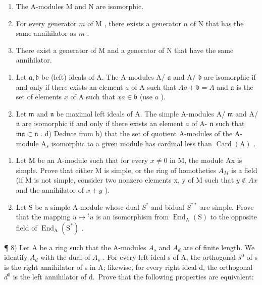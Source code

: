 \begin{enumerate}
\def\labelenumi{(\roman{enumi})}
\item
  The A-modules M and N are isomorphic.
\item
  For every generator \(m\) of \(\mathrm{M}\) , there exists a generator \(n\) of \(\mathrm{N}\) that has the same annihilator as \(m\) .
\item
  There exist a generator of M and a generator of N that have the same annihilator.
\end{enumerate}

\begin{enumerate}
\def\labelenumi{\alph{enumi})}
\setcounter{enumi}{1}
\item
  Let \(\mathfrak{a},\mathfrak{b}\) be (left) ideals of A. The A-modules A/ \(\mathfrak{a}\) and A/ \(\mathfrak{b}\) are isomorphic if and only if there exists an element \(a\) of A such that \(Aa + \mathfrak{b} = A\) and \(\mathfrak{a}\) is the set of elements \(x\) of A such that \(xa\in \mathfrak{b}\) (use \(a\) ).
\item
  Let \(\mathfrak{m}\) and \(\mathfrak{n}\) be maximal left ideals of A. The simple A-modules A/ \(\mathfrak{m}\) and A/ \(\mathfrak{n}\) are isomorphic if and only if there exists an element \(a\) of A- \(\mathfrak{n}\) such that \(\mathfrak{ma} \subset \mathfrak{n}\) . d) Deduce from b) that the set of quotient A-modules of the A-module \(\mathrm{A}_s\) isomorphic to a given module has cardinal less than \(\operatorname{Card}(\mathrm{A})\) .
\end{enumerate}

\begin{enumerate}
\def\labelenumi{\arabic{enumi})}
\setcounter{enumi}{5}
\item
  Let M be an A-module such that for every \(x \neq 0\) in M, the module Ax is simple. Prove that either M is simple, or the ring of homotheties \(A_{M}\) is a field (if M is not simple, consider two nonzero elements x, y of M such that \(y \notin Ax\) and the annihilator of \(x + y\) ).
\item
  Let S be a simple A-module whose dual \(S^{*}\) and bidual \(S^{**}\) are simple. Prove that the mapping \(u \mapsto {}^{t}u\) is an isomorphism from \(\operatorname{End}_{\mathrm{A}}(\mathrm{S})\) to the opposite field of \(\operatorname{End}_{\mathrm{A}}(\mathrm{S}^{*})\) .
\end{enumerate}

¶ 8) Let A be a ring such that the A-modules \(A_{s}\) and \(A_{d}\) are of finite length. We identify \(A_{d}\) with the dual of \(A_{s}\) . For every left ideal s of A, the orthogonal \(s^{0}\) of s is the right annihilator of s in A; likewise, for every right ideal d, the orthogonal \(d^{0}\) is the left annihilator of d.~Prove that the following properties are equivalent:

